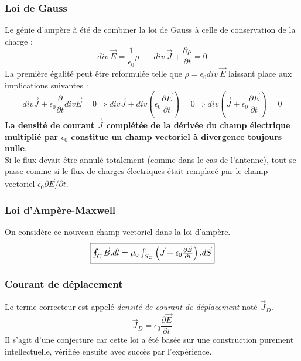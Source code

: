 \documentclass[british,french,11pt, a4paper, openany]{book}
\begin{document}
	\subsubsection{Loi de Gauss}
	Le génie d'ampère à été de combiner la loi de Gauss à celle de conservation de la charge : 
	\begin{equation}
		div\ \vec{E} = \frac{1}{\epsilon_0}\rho\ \ \ \ \ \ \ \ div\ \vec{J} + \frac{\partial \rho}{\partial t} = 0
	\end{equation}
	La première égalité peut être reformulée telle que $\rho = \epsilon_0div\ \vec{E}$ laissant place aux implications suivantes :
	\begin{equation}
		div\vec{J} + \epsilon_0 \frac{\partial}{\partial t}div\vec{E} = 0 \Rightarrow div\vec{J} + div\left(\epsilon_0\frac{\partial\vec{E}}{\partial t}\right) = 0 \Rightarrow div\left(\vec{J} + \epsilon_0\frac{\partial\vec{E}}{\partial t}\right) = 0
	\end{equation}
	\textbf{La densité de courant $\vec{J}$ complétée de la dérivée du champ électrique multiplié par $\epsilon_0$ constitue un champ vectoriel à divergence toujours nulle}.\\
	
	Si le flux devait être annulé totalement (comme dans le cas de l'antenne), tout se passe comme si le flux de charges électriques était remplacé par le champ vectoriel $\epsilon_0 \partial\vec{E}/\partial t$.
	
	\subsubsection{Loi d'Ampère-Maxwell}
	On considère ce nouveau champ vectoriel dans la loi d'ampère.
	\begin{equation}
		\fbox{$ \oint_C \vec{B}.\vec{dl} = \mu_0   \int_{S_C}\left(\vec{J} + \epsilon_0 \frac{\partial \vec{E}}{\partial t}\right).d\vec{S}$}
	\end{equation}
	
	\subsubsection{Courant de déplacement}
	Le terme correcteur est appelé \textit{densité de courant de déplacement} noté $\vec{J}_D$.
	\begin{equation}
		\vec{J}_D = \epsilon_0 \frac{\partial \vec{E}}{\partial t}
	\end{equation}
	Il s'agit d'une conjecture car cette loi a été basée sur une construction purement intellectuelle, vérifiée ensuite avec succès par l'expérience.\\
	
\end{document}
